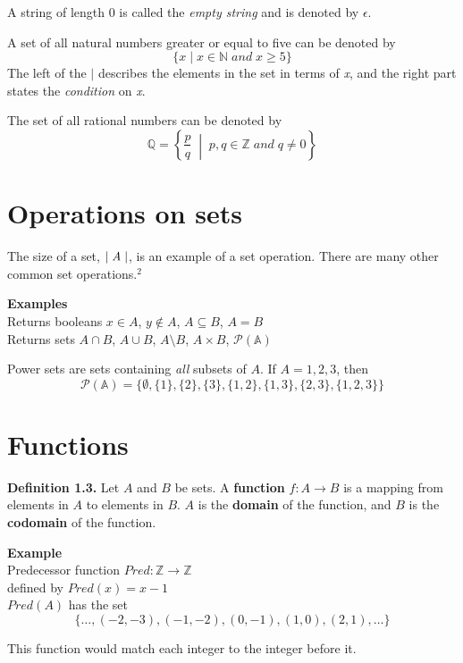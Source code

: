 \documentclass{article}
\begin{document}
A string of length 0 is called the \emph{empty string} and is denoted 
by $\epsilon$.

A set of all natural numbers greater or equal to five can be denoted by
$$ \{ x \mid x \in \mathbb{N} \; and \; x \geq 5 \} $$ 
The left of the $\mid$ describes the elements in the set in terms of \emph{x},
and the right part states the \emph{condition} on \emph{x}.

The set of all rational numbers can be denoted by
$$ \mathbb{Q} = \left\{ \frac{p}{q} \; \middle\vert \; p, q \in \mathbb{Z} \; and \; q \neq 0 \right\} $$

\section{Operations on sets} 
The size of a set, $\mid \emph{A} \mid$, is an example of a set operation. There
are many other common set operations.$^2$


\textbf{Examples}\\
Returns booleans \hfill $x \in A$, $y \not\in A$, $A \subseteq B$, $A = B$ \\
Returns sets \hfill $A \cap B$, $A \cup B$, $A\setminus B$, $A \times B$, $\mathcal{P}(\mathbb{A})$

Power sets are sets containing \emph{all} subsets of $A$. If $A = {1, 2, 3}$, then
$$\mathcal{P}(\mathbb{A}) = \{\emptyset, \{1\}, \{2\}, \{3\}, \{1, 2\}, 
\{1, 3\}, \{2, 3\}, \{1, 2, 3\}\}$$

\newpage
\section{Functions}
\textbf{Definition 1.3.} Let $A$ and $B$ be sets. A \textbf{function} $ f
: A \to B $ is a mapping from elements in $A$ to elements in $B$. $A$ is the
\textbf{domain} of the function, and $B$ is the \textbf{codomain} of the 
function.

\textbf{Example} \\
Predecessor function \hfill $Pred: \mathbb{Z} \to \mathbb{Z} $ \\
defined by \hfill $Pred(x) = x - 1$ \\ 
$Pred(A) $ has the set  
$$ \{ \ldots, (-2, -3), (-1, -2), (0, -1), (1, 0), (2, 1), \ldots \} $$

This function would match each integer to the integer before it.
\end{document}

